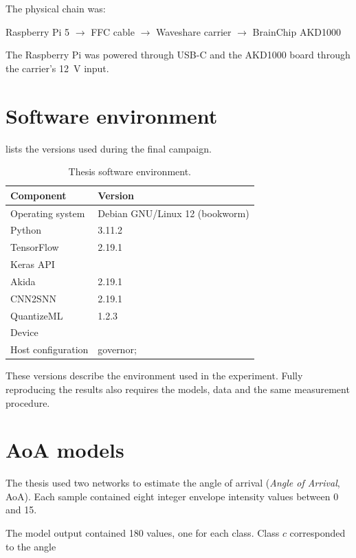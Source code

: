 The physical chain was:

\begin{center}
Raspberry Pi 5
$\rightarrow$
FFC cable
$\rightarrow$
Waveshare carrier
$\rightarrow$
BrainChip AKD1000
\end{center}

The Raspberry Pi was powered through USB-C and the AKD1000 board through the carrier's
12~V input.

\section{Software environment}

 lists the versions used during the final campaign.

\begin{table}[H]
\centering
\caption{Thesis software environment.}
\label{tab:tfg-env}
\begin{tabularx}{\textwidth}{@{}L{0.32\textwidth}Y@{}}
\toprule
\textbf{Component} & \textbf{Version} \\
\midrule
Operating system & Debian GNU/Linux 12 (bookworm) \\
Python & 3.11.2 \\
TensorFlow & 2.19.1 \\
Keras API &  \\
Akida & 2.19.1 \\
CNN2SNN & 2.19.1 \\
QuantizeML & 1.2.3 \\
Device &  \\
Host configuration &  governor;  \\
\bottomrule
\end{tabularx}
\end{table}

These versions describe the environment used in the experiment. Fully reproducing
the results also requires the models, data and the same measurement procedure.

\section{AoA models}

The thesis used two networks to estimate the angle of arrival (\emph{Angle of Arrival},
AoA). Each sample contained eight integer envelope intensity values between 0 and 15.

The model output contained 180 values, one for each class. Class $c$ corresponded
to the angle

